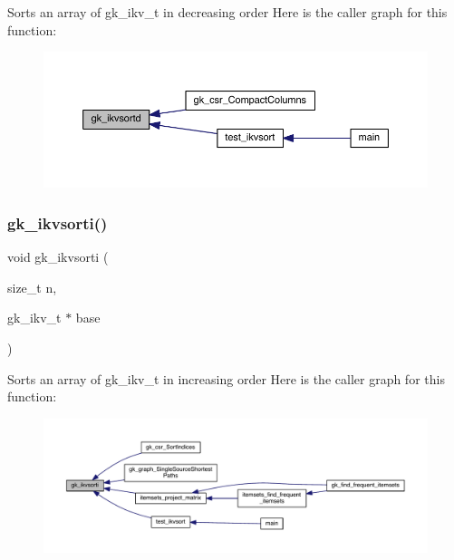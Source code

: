 Sorts an array of gk\+\_\+ikv\+\_\+t in decreasing order Here is the caller graph for this function\+:\nopagebreak
\begin{figure}[H]
\begin{center}
\leavevmode
\includegraphics[width=350pt]{a00077_a6630af89129be5c65ca81e3f3cfc3f9f_icgraph}
\end{center}
\end{figure}
\mbox{\label{a00077_a87b4cd1adb002c1987c1537130e8ee31}} 
\subsubsection{\texorpdfstring{gk\+\_\+ikvsorti()}{gk\_ikvsorti()}}
{\footnotesize\ttfamily void gk\+\_\+ikvsorti (\begin{DoxyParamCaption}\item[{size\+\_\+t}]{n,  }\item[{gk\+\_\+ikv\+\_\+t $\ast$}]{base }\end{DoxyParamCaption})}

Sorts an array of gk\+\_\+ikv\+\_\+t in increasing order Here is the caller graph for this function\+:\nopagebreak
\begin{figure}[H]
\begin{center}
\leavevmode
\includegraphics[width=350pt]{a00077_a87b4cd1adb002c1987c1537130e8ee31_icgraph}
\end{center}
\end{figure}
\mbox{\label{a00077_a36a2b736c24758a30ff91e715c68b3a5}} 

